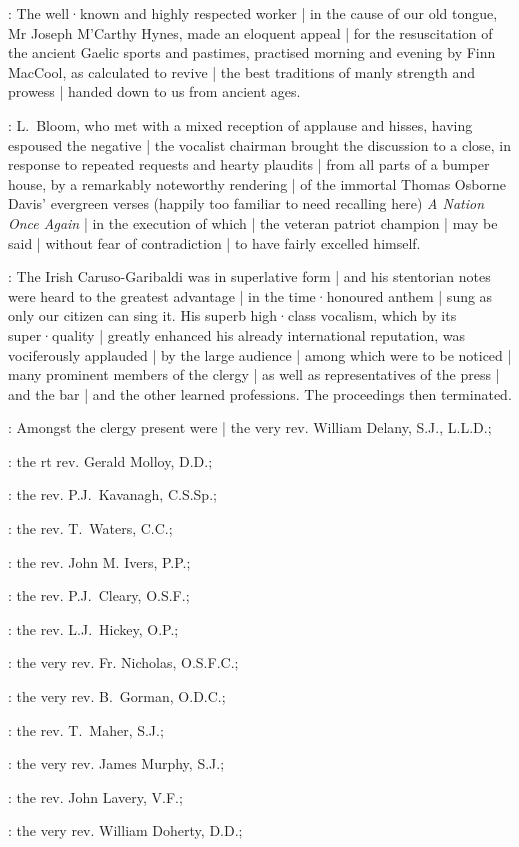 :
The well·known and highly respected worker |
in the cause of our old tongue,
Mr Joseph M'Carthy Hynes,
made an eloquent appeal |
for the resuscitation of the ancient Gaelic sports and pastimes,
practised morning and evening by Finn MacCool,
as calculated to revive |
the best traditions of manly strength and prowess |
handed down to us from ancient ages.

:
L.~Bloom,
who met with a mixed reception of applause and hisses,
having espoused the negative |
the vocalist chairman brought the discussion to a close,
in response to repeated requests and hearty plaudits |
from all parts of a bumper house,
by a remarkably noteworthy rendering |
of the immortal Thomas Osborne Davis' evergreen verses
(happily too familiar to need recalling here)
\emph{A Nation Once Again} |
in the execution of which |
the veteran patriot champion |
may be said |
without fear of contradiction |
to have fairly excelled himself.

:
The Irish Caruso-Garibaldi was in superlative form
 |
and his stentorian notes were heard to the greatest advantage |
in the time·honoured anthem |
sung as only our citizen can sing it.
His superb high·class vocalism,
which by its super·quality |
greatly enhanced his already international reputation,
was vociferously applauded |
by the large audience |
among which were to be noticed |
many prominent members of the clergy |
as well as representatives of the press |
and the bar |
and the other learned professions.
The proceedings then terminated.

:
Amongst the clergy present were |
the very rev. William Delany, S.J., L.L.D.;

:
the rt rev. Gerald Molloy, D.D.;

:
the rev. P.J.~Kavanagh, C.S.Sp.;

:
the rev. T.~Waters, C.C.;

:
the rev. John M. Ivers, P.P.;

:
the rev. P.J.~Cleary, O.S.F.;

:
the rev. L.J.~Hickey, O.P.;

:
the very rev. Fr. Nicholas, O.S.F.C.;

:
the very rev. B.~Gorman, O.D.C.;

:
the rev. T.~Maher, S.J.;

:
the very rev. James Murphy, S.J.;

:
the rev. John Lavery, V.F.;

:
the very rev. William Doherty, D.D.;

